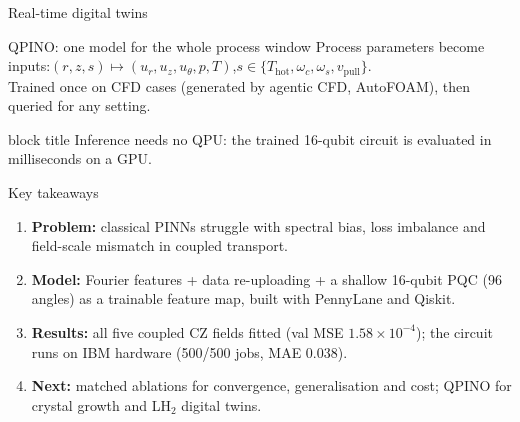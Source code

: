 \documentclass[aspectratio=169,10pt]{beamer}
\newcommand{\takeaway}[1]{%
  \vfill
  \begin{beamercolorbox}[rounded=true,shadow=false,wd=\linewidth,sep=4pt]{block title}
  \small\centering #1
  \end{beamercolorbox}}
\begin{document}
\begin{frame}{Real-time digital twins}
\centering
{}

\vspace{0.4cm}
\begin{block}{QPINO: one model for the whole process window}
\small Process parameters become inputs:\quad $(r,z,s)\mapsto(u_r,u_z,u_\theta,p,T)$,\quad $s\in\{T_{\mathrm{hot}},\omega_c,\omega_s,v_{\mathrm{pull}}\}$.\\
Trained once on CFD cases (generated by agentic CFD, AutoFOAM), then queried for any setting.
\end{block}
\takeaway{Inference needs no QPU: the trained 16-qubit circuit is evaluated in milliseconds on a GPU.}
\end{frame}

\begin{frame}{Key takeaways}
\begin{enumerate}\setlength{\itemsep}{5pt}
  \item \textbf{Problem:} classical PINNs struggle with spectral bias, loss imbalance and field-scale mismatch in coupled transport.
  \item \textbf{Model:} Fourier features + data re-uploading + a shallow 16-qubit PQC (96 angles) as a trainable feature map, built with PennyLane and Qiskit.
  \item \textbf{Results:} all five coupled CZ fields fitted (val MSE $1.58\times10^{-4}$); the circuit runs on IBM hardware (500/500 jobs, MAE 0.038).
  \item \textbf{Next:} matched ablations for convergence, generalisation and cost; QPINO for crystal growth and LH$_2$ digital twins.
\end{enumerate}
\end{frame}
\end{document}
